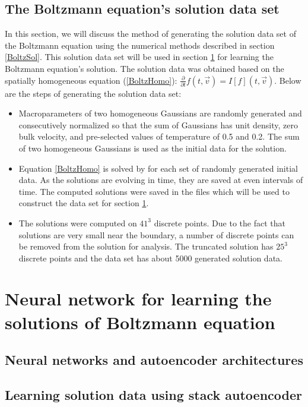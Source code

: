 \documentclass{article}
\begin{document}
\subsection{The Boltzmann equation's solution data set}
In this section, we will discuss the method of generating the solution data set of the Boltzmann equation using the numerical methods described in section \ref{BoltzSol}. This solution data set will be used in section \ref{NN} for learning the Boltzmann equation's solution. The solution data was obtained based on the spatially homogeneous equation (\ref{BoltzHomo}): $\frac{\partial}{\partial t}f(t,\vec{v}) = I[f](t, \vec{v})$. Below are the steps of generating the solution data set:
\begin{itemize}
\item Macroparameters of two homogeneous Gaussians are randomly generated and consecutively normalized so that the sum of Gaussians has unit density, zero bulk velocity, and pre-selected values of temperature of 0.5 and 0.2. The sum of two homogeneous Gaussians is used as the initial data for the solution.
\item Equation \ref{BoltzHomo} is solved by \cite{Alekseenko4} for each set of randomly generated initial data. As the solutions are evolving in time, they are saved at even intervals of time. The computed solutions were saved in the files which will be used to construct the data set for section \ref{NN}.
\item The solutions were computed on $41^3$ discrete points. Due to the fact that solutions are very small near the boundary, a number of discrete points can be removed from the solution for analysis. The truncated solution has $25^3$ discrete points and the data set has about 5000  generated solution data.
 
\end{itemize}

\section{Neural network for learning the solutions of Boltzmann equation} \label{NN}
\subsection{Neural networks and autoencoder architectures}
\subsection{Learning solution data using stack autoencoder}
\end{document}
